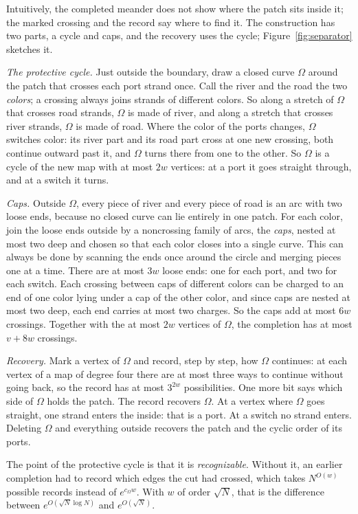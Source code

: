 Intuitively, the completed meander does not show where the patch sits inside it; the marked crossing
and the record say where to find it. The construction has two parts, a cycle and caps, and the
recovery uses the cycle; Figure~\ref{fig:separator} sketches it.

\emph{The protective cycle.} Just outside the boundary, draw a closed curve $\Omega$ around the patch that
crosses each port strand once. Call the river and the road the two \emph{colors}; a crossing always
joins strands of different colors. So along a stretch of $\Omega$ that crosses road strands, $\Omega$ is
made of river, and along a stretch that crosses river strands, $\Omega$ is made of road. Where the color
of the ports changes,
$\Omega$ switches color: its river part and its road part cross at one new crossing, both continue
outward past it, and $\Omega$ turns there from one to the other. So $\Omega$ is a cycle of the new map
with at most $2w$ vertices: at a port it goes straight through, and at a switch it turns.

\emph{Caps.} Outside $\Omega$, every piece of river and every piece of road is an arc with two loose ends,
because no closed curve can lie entirely in one patch. For each color, join the loose ends outside
by a noncrossing family of arcs, the \emph{caps}, nested at most two deep and chosen so that each
color closes into a single curve. This can always be done by scanning the ends once around the circle
and merging pieces one at a time. There are at most $3w$ loose ends: one for each port, and two for each switch.
Each crossing between caps of different colors can be charged to an end of one color lying under a
cap of the other color, and since caps are nested at most two deep, each end carries at most two
charges. So the caps add at most $6w$ crossings. Together with the at most $2w$ vertices of $\Omega$, the completion has at most $v+8w$
crossings.

\emph{Recovery.} Mark a vertex of $\Omega$ and record, step by step, how $\Omega$ continues: at each vertex of a
map of degree four there are at most three ways to continue without going back, so the record has at most
$3^{2w}$ possibilities. One more bit says which side of $\Omega$ holds the patch. The record recovers $\Omega$.
At a vertex where $\Omega$ goes straight, one strand enters the inside: that is a port. At a switch no
strand enters. Deleting $\Omega$ and everything outside recovers the patch and the cyclic order of its
ports.

The point of the protective cycle is that it is \emph{recognizable}. Without it, an earlier
completion had to record which edges the cut had crossed, which takes $N^{O(w)}$ possible records
instead of $e^{c_\Omega w}$. With $w$ of order $\sqrt N$, that is the difference between
$e^{O(\sqrt N\log N)}$ and $e^{O(\sqrt N)}$.

